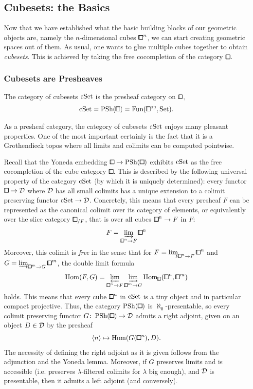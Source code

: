\subsection{Cubesets: the Basics}\label{ssec:cubesets-basics}

Now that we have established what the basic building blocks of our geometric objects are,
namely the $n$-dimensional cubes ${\bbox}^n$, we can start creating geometric spaces out of them.
As usual, one wants to glue multiple cubes together to obtain \emph{cubesets}.
This is achieved by taking the free cocompletion of the category $\bbox$.

\subsubsection{Cubesets are Presheaves}

\begin{definition}\label{def:cubeset}
The category of cubesets $\mathrm{cSet}$ is the presheaf category on $\bbox$,
\[
    \cSet = \PSh(\bbox) = \Fun({\bbox}^{\op},\Set).
\]
\end{definition}

As a presheaf category, the category of cubesets $\mathrm{cSet}$ enjoys many pleasant properties.
One of the most important certainly is the fact that it is a Grothendieck topos
where all limits and colimits can be computed pointwise.

Recall that the Yoneda embedding $\bbox\to\PSh(\bbox)$ exhibits $\mathrm{cSet}$ as the free cocompletion
of the cube category $\bbox$.
This is described by the following universal property of the category $\mathrm{cSet}$ (by which it is uniquely determined):
every functor $\bbox\to\mcD$ where $\mathcal{D}$ has all small colimits
has a unique extension to a colimit preserving functor $\mathrm{cSet}\to\mathcal{D}$.
Concretely, this means that every presheaf $F$ can be represented as the canonical colimit over its category of elements,
or equivalently over the slice category $\bbox_{/F}$, that is over all cubes ${\bbox}^n\to F$ in $F$:
\[
    F = \varinjlim_{{\bbox}^n\to F}{\bbox}^n
\]
Moreover, this colimit is \emph{free} in the sense that for
$F = \varinjlim_{{\bbox}^n\to F} {\bbox}^n$ and $G = \varinjlim_{{\bbox}^m\to G} {\bbox}^m$,
the double limit formula
\[
    \hom(F,G) = \varprojlim_{{\bbox}^n\to F}\varinjlim_{{\bbox}^m\to G}\hom_{\bbox}({\bbox}^n,{\bbox}^m)
\]
holds.
This means that every cube ${\bbox}^n$ in $\mathrm{cSet}$ is a tiny object and in particular compact projective.
Thus, the category $\PSh(\bbox)$ is $\aleph_0$-presentable, so every colimit preserving functor
$G\colon\PSh(\bbox)\to\mcD$ admits a right adjoint, given on an object $D\in\mathcal{D}$ by the presheaf
\[
    \langle n\rangle\mapsto\hom(G({\bbox}^n),D).
\]
The necessity of defining the right adjoint as it is given follows from the adjunction and the Yoneda lemma.
Moreover, if $G$ preserves limits and is accessible
(i.e. preserves $\lambda$-filtered colimits for $\lambda$ big enough), and $\mathcal{D}$ is presentable,
then it admits a left adjoint (and conversely).


